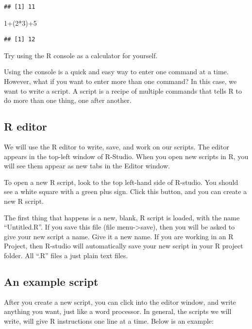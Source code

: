 \documentclass[]{book}
\newenvironment{Shaded}{\begin{snugshade}}{\end{snugshade}}
\newcommand{\DecValTok}[1]{\textcolor[rgb]{0.00,0.00,0.81}{{#1}}}
\newcommand{\NormalTok}[1]{{#1}}
\theoremstyle{definition}
\theoremstyle{definition}
\theoremstyle{definition}
\theoremstyle{remark}
\begin{document}
\begin{verbatim}
## [1] 11
\end{verbatim}

\begin{Shaded}
\begin{Highlighting}[]
\DecValTok{1}\NormalTok{+(}\DecValTok{2}\NormalTok{*}\DecValTok{3}\NormalTok{)+}\DecValTok{5}
\end{Highlighting}
\end{Shaded}

\begin{verbatim}
## [1] 12
\end{verbatim}

Try using the R console as a calculator for yourself.

Using the console is a quick and easy way to enter one command at a
time. However, what if you want to enter more than one command? In this
case, we want to write a script. A script is a recipe of multiple
commands that tells R to do more than one thing, one after another.

\subsection{R editor}\label{r-editor}

We will use the R editor to write, save, and work on our scripts. The
editor appears in the top-left window of R-Studio. When you open new
scripts in R, you will see them appear as new tabs in the Editor window.

To open a new R script, look to the top left-hand side of R-studio. You
should see a white square with a green plus sign. Click this button, and
you can create a new R script.

The first thing that happens is a new, blank, R script is loaded, with
the name ``Untitled.R''. If you save this file (file
menu-\textgreater{}save), then you will be asked to give your new script
a name. Give it a new name. If you are working in an R Project, then
R-studio will automatically save your new script in your R project
folder. All ``.R'' files a just plain text files.

\subsection{An example script}\label{an-example-script}

After you create a new script, you can click into the editor window, and
write anything you want, just like a word processor. In general, the
scripts we will write, will give R instructions one line at a time.
Below is an example:
\end{document}
